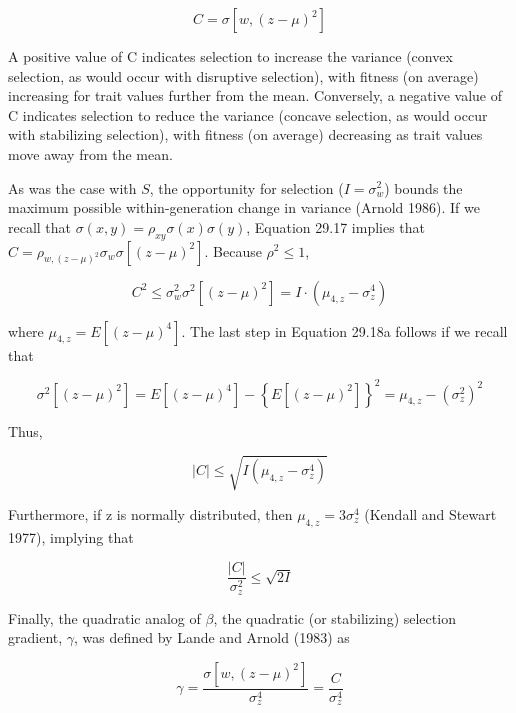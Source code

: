 \documentclass{article}
\begin{document}
\begin{equation}
C=\sigma\left[w,(z-\mu)^{2}\right]
\tag{29.17}
\label{eq:29_17}
\end{equation}

A positive value of C indicates selection to increase the variance (convex selection, as would occur with disruptive selection), with fitness (on average) increasing for trait values further from the mean. Conversely, a negative value of C indicates selection to reduce the variance (concave selection, as would occur with stabilizing selection), with fitness (on average) decreasing as trait values move away from the mean.

As was the case with $S$, the opportunity for selection ($I = \sigma_w^2$) bounds the maximum possible within-generation change in variance (Arnold 1986). If we recall that $\sigma(x, y) = \rho_{xy} \sigma(x) \sigma(y)$, Equation 29.17 implies that $C = \rho_{w,(z-\mu)^2} \sigma_w \sigma[(z-\mu)^2]$. Because $\rho^2 \leq 1$,

\begin{equation}
C^{2}\leq\sigma_{w}^{2}\sigma^{2}[(z-\mu)^{2}]=I\cdot\left(\mu_{4,z}-\sigma_{z}^{4}\right)
\tag{29.18a}
\label{eq:29_18a}
\end{equation}

where  $ \mu_{4,z} = E[(z - \mu)^{4}] $. The last step in Equation 29.18a follows if we recall that

\begin{equation}
\sigma^{2}[(z-\mu)^{2}]=E[(z-\mu)^{4}]-\left\{E[(z-\mu)^{2}]\right\}^{2}=\mu_{4,z}-\left(\sigma_{z}^{2}\right)^{2}
\end{equation}

Thus,

\begin{equation}
|C|\leq\sqrt{I\left(\mu_{4,z}-\sigma_{z}^{4}\right)}
\tag{29.18b}
\label{eq:29_18b}
\end{equation}

Furthermore, if z is normally distributed, then  $ \mu_{4,z} = 3\sigma_{z}^{4} $ (Kendall and Stewart 1977), implying that

\begin{equation}
\frac{|C|}{\sigma_{z}^{2}}\leq\sqrt{2I}
\tag{29.18c}
\label{eq:29_18c}
\end{equation}

Finally, the quadratic analog of  $ \beta $, the quadratic (or stabilizing) selection gradient,  $ \gamma $, was defined by Lande and Arnold (1983) as

\begin{equation}
\gamma=\frac{\sigma\left[w,(z-\mu)^{2}\right]}{\sigma_{z}^{4}}=\frac{C}{\sigma_{z}^{4}}
\tag{29.19}
\label{eq:29_19}
\end{equation}
\end{document}
